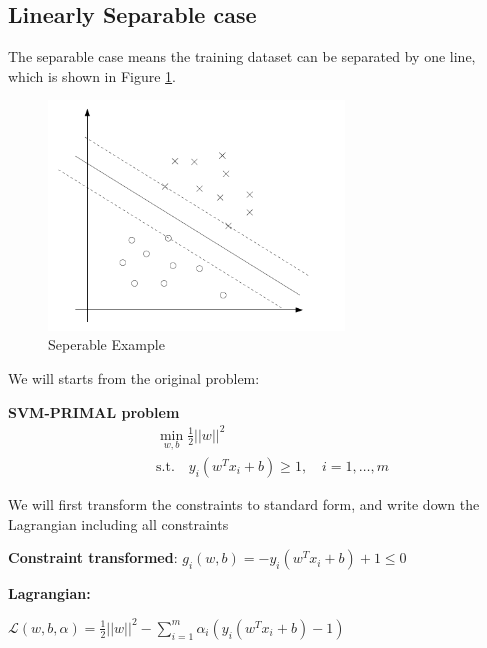 \documentclass[a4paper]{article}
\begin{document}
\subsection{Linearly Separable case}
The separable case means the training dataset can be separated by one line, which is shown in Figure \ref{fig:separable}. 
\begin{figure}[h!]
  \centering
    \includegraphics[width=0.7\textwidth]{./images/separable}
  \caption{Seperable Example}\label{fig:separable}
\end{figure}
We will starts from the original problem:

\textbf{SVM-PRIMAL problem}
\begin{align*}
	& \min_{w, b} \frac{1}{2} ||w||^2 \\
	\quad & \text{s.t.} \quad y_i (w^T x_i + b) \geq 1, \quad i = 1, \dots, m
\end{align*}

We will first transform the constraints to standard form, and write down the Lagrangian including all constraints 

\textbf{Constraint transformed}: $g_i (w, b) = -y_i (w^T x_i + b) + 1 \leq 0$

\textbf{Lagrangian:}

\hspace{10ex}	$\mathcal{L}(w, b, \alpha) = \frac{1}{2} ||w||^2 - \sum_{i=1}^{m}\alpha_i (y_i(w^T x_i +b) - 1)$ \\
\end{document}
